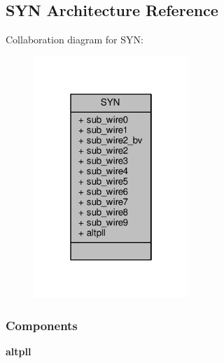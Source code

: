 \subsection{S\+YN Architecture Reference}
\label{classpll_1_1SYN}


Collaboration diagram for S\+YN\+:\nopagebreak
\begin{figure}[H]
\begin{center}
\leavevmode
\includegraphics[width=166pt]{df/d18/classpll_1_1SYN__coll__graph}
\end{center}
\end{figure}
\subsubsection*{Components}
 \begin{DoxyCompactItemize}
\item 
{\bf altpll}  {\bfseries }  
\end{DoxyCompactItemize}
